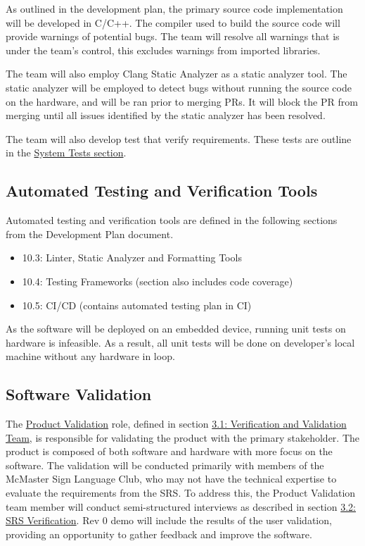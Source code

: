 \documentclass[12pt, titlepage]{article}
\begin{document}
As outlined in the development plan, the primary source code implementation
will be developed in C/C++. The compiler used to build the source code
will provide warnings of potential bugs. The team will resolve all
warnings that is under the team's control, this excludes warnings from
imported libraries. \newline

The team will also employ Clang Static Analyzer \cite{clangStaticAnalyzer} as
a static analyzer tool. The static analyzer will be employed to detect bugs
without running the source code on the hardware, and will be ran prior to
merging PRs. It will block the PR from merging until all issues identified by
the static analyzer has been resolved.

The team will also develop test that verify requirements. These tests are
outline in the \hyperref[sec:system_tests]{System Tests section}.

\subsection{Automated Testing and Verification Tools}
\label{sec:testing_tools}

Automated testing and verification tools are defined in the following sections
from the Development Plan document.

\begin{itemize}
  \item 10.3: Linter, Static Analyzer and Formatting Tools
  \item 10.4: Testing Frameworks (section also includes code coverage)
  \item 10.5: CI/CD (contains automated testing plan in CI)
\end{itemize}

As the software will be deployed on an embedded device, running unit tests on
hardware is infeasible. As a result, all unit tests will be done on developer's
local machine without any hardware in loop.

\subsection{Software Validation}\label{sec:software_validation}

The \hyperref[role:product_validation]{Product Validation} role, defined in
section \hyperref[sec:vnv_team]{3.1: Verification and Validation Team}, is
responsible for validating the product with the primary stakeholder. The
product is composed of both software and hardware with more focus on the
software. The validation will be conducted primarily with members of the
McMaster Sign Language Club, who may not have the technical expertise to
evaluate the requirements from the SRS. To address this, the Product Validation
team member will conduct semi-structured interviews as described in section
\hyperref[sec:srs_verification]{3.2: SRS Verification}. Rev 0 demo will include
the results of the user validation, providing an opportunity to gather feedback
and improve the software.
\end{document}
